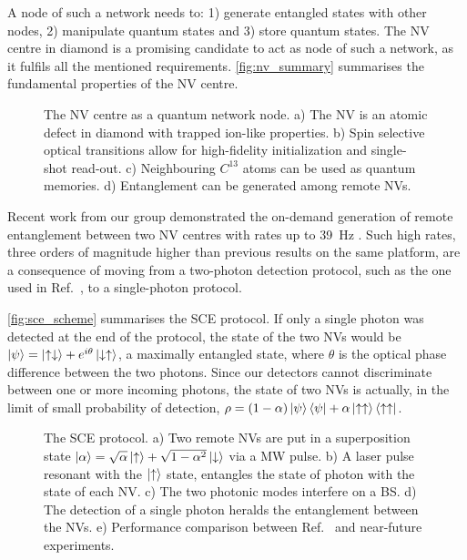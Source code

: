 \documentclass[a4paper, twoside]{article}
\begin{document}
A node of such a network needs to: 1) generate entangled states with other nodes, 2) manipulate quantum states and 3) store quantum states. The \ac{NV} centre in diamond is a promising candidate to act as node of such a network, as it fulfils all the mentioned requirements. \autoref{fig:nv_summary} summarises the fundamental properties of the \ac{NV} centre.

\begin{figure}
	\caption{The \ac{NV} centre as a quantum network node. a) The \ac{NV} is an atomic defect in diamond with trapped ion-like properties. b) Spin selective optical transitions allow for high-fidelity initialization and single-shot read-out. c) Neighbouring $C^{13}$ atoms can be used as quantum memories. d) Entanglement can be generated among remote \acp{NV}.}
	\label{fig:nv_summary}
\end{figure}

Recent work from our group demonstrated the on-demand generation of remote entanglement between two \ac{NV} centres with rates up to \SI{39}{\Hz} \cite{Humphreys2018}. Such high rates, three orders of magnitude higher than previous results on the same platform, are a consequence of moving from a two-photon detection protocol, such as the one used in Ref.~\cite{Hensen2015}, to a single-photon protocol.

\autoref{fig:sce_scheme} summarises the \ac{SCE} protocol. If only a single photon was detected at the end of the protocol, the state of the two \acp{NV} would be $\ket\psi = \ket{\uparrow\downarrow} + e^{i\theta}\ket{\downarrow\uparrow}$, a maximally entangled state, where $\theta$ is the optical phase difference between the two photons. Since our detectors cannot discriminate between one or more incoming photons, the state of two \acp{NV} is actually, in the limit of small probability of detection, $\rho = (1-\alpha)\ket\psi\bra\psi + \alpha\ket{\uparrow\uparrow}\bra{\uparrow\uparrow}$.

\begin{figure}
	\caption{The \acf{SCE} protocol.
	a) Two remote \acp{NV} are put in a superposition state $\ket\alpha = \sqrt\alpha\ket\uparrow + \sqrt{1-\alpha^2}\ket\downarrow$ via a \ac{MW} pulse.
	b) A laser pulse resonant with the $\ket\uparrow$ state, entangles the state of photon with the state of each \ac{NV}.
	c) The two photonic modes interfere on a \ac{BS}.
	d) The detection of a single photon heralds the entanglement between the \acp{NV}.
	e) Performance comparison between Ref.~\cite{Humphreys2018} and near-future experiments.}
	\label{fig:sce_scheme}
\end{figure}
\end{document}

